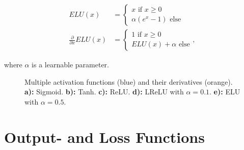 \begin {align}
	ELU(x) &= \begin{cases}
			x \text { if } x \geq 0\\
			\alpha(e^x - 1) \text{ else}
		     \end{cases}\\
	\frac{\partial}{\partial x} ELU(x) &= \begin{cases}
								1 \text { if } x \geq 0\\
								ELU(x) + \alpha \text{ else}
		    				     \end{cases},
\end {align}

\noindent where $\alpha$ is a learnable parameter.


\begin {figure}[!ht]
	\begin {subfigure}[{position=b}]{0.3\linewidth}
		\scalebox{0.60}{}
		\caption{}
	\end {subfigure}
		\begin {subfigure}[{position=b}]{0.3\linewidth}
		\scalebox{0.60}{}
		\caption{}
	\end {subfigure}
	\begin {subfigure}[{position=b}]{0.3\linewidth}
		\scalebox{0.60}{}
		\caption{}
	\end {subfigure}
	\begin {center}
	\begin {subfigure}[{position=b}]{0.3\linewidth}
		\scalebox{0.60}{}
		\caption{}
	\end {subfigure}
	\begin {subfigure}[{position=b}]{0.3\linewidth}
		\scalebox{0.60}{}
		\caption{}
	\end {subfigure}
	\end{center}

		\caption[]{Multiple activation functions (blue) and their derivatives (orange). \textbf{a):} Sigmoid. \textbf{b):} Tanh. \textbf{c):} ReLU. \textbf{d):} LReLU with $\alpha = 0.1$. \textbf{e):} ELU with $\alpha = 0.5$.}
		\label{fig:activation_functions}

\end {figure}

	\section {Output- and Loss Functions}

